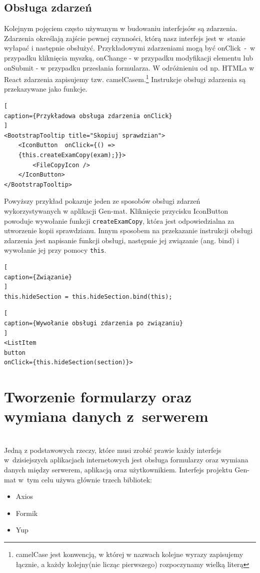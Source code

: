 \documentclass[oneside,polski,logo,indent]{amuthesis}
\begin{document}
\subsection{Obsługa zdarzeń}
{
Kolejnym pojęciem często używanym w budowaniu interfejsów są zdarzenia. Zdarzenia określają zajście pewnej czynności, którą nasz interfejs jest w~stanie wyłapać i następnie obsłużyć.
Przykładowymi zdarzeniami mogą być onClick~-~w przypadku kliknięcia myszką, onChange - w przypadku modyfikacji elementu lub onSubmit - w przypadku przesłania formularza.
W odróżnieniu od np. HTMLa w React zdarzenia zapisujemy tzw. camelCasem.\footnote{camelCase jest konwencją, w której w nazwach kolejne wyrazy zapisujemy łącznie, a każdy kolejny(nie licząc pierwszego) rozpoczynamy wielką literą}
Instrukcje obsługi zdarzenia są przekazywane jako funkcje.
\begin{lstlisting}[
caption={Przykładowa obsługa zdarzenia onClick}
]
<BootstrapTooltip title="Skopiuj sprawdzian">
	<IconButton  onClick={() => 
	{this.createExamCopy(exam);}}>
		<FileCopyIcon />
	</IconButton>
</BootstrapTooltip>
\end{lstlisting}
}
Powyższy przykład pokazuje jeden ze sposobów obsługi zdarzeń wykorzystywanych w aplikacji Gen-mat. Kliknięcie przycisku IconButton powoduje wywołanie funkcji \texttt{createExamCopy}, która jest odpowiedzialna za utworzenie kopii sprawdzianu.
Innym sposobem na przekazanie instrukcji obsługi zdarzenia jest napisanie funkcji obsługi, następnie jej związanie (ang. bind) i wywołanie jej przy pomocy \texttt{this}.
\begin{lstlisting}[
caption={Związanie}
]
this.hideSection = this.hideSection.bind(this);
\end{lstlisting}
\begin{lstlisting}[
caption={Wywołanie obsługi zdarzenia po związaniu}
]
<ListItem
button 
onClick={this.hideSection(section)}>
\end{lstlisting}
\section{Tworzenie formularzy oraz wymiana danych z~serwerem} \mbox{}\\
Jedną z podstawowych rzeczy, które musi zrobić prawie każdy interfejs w~dzisiejszych aplikacjach internetowych jest obsługa formularzy oraz wymiana danych między serwerem, aplikacją oraz użytkownikiem. Interfejs projektu Gen-mat w~tym celu używa głównie trzech bibliotek:
\begin{itemize}
\item Axios
\item Formik
\item Yup
\end{itemize}
\end{document}
